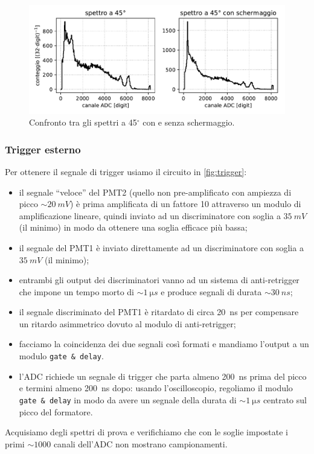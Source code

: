\begin{figure}
	\centering
	\includegraphics[width=\textwidth]{plotcasetta}
	\caption{Confronto tra gli spettri a 45$^{\circ}$ con e senza schermaggio.}
	\label{casetta}
\end{figure}

\subsubsection{Trigger esterno}
Per ottenere il segnale di trigger usiamo il circuito in \autoref{fig:trigger}:
\begin{itemize}
	\item il segnale ``veloce'' del PMT2 (quello non pre-amplificato con ampiezza di picco $\sim\SI{20}{mV}$) è prima amplificata di un fattore 10 attraverso un modulo di amplificazione lineare, quindi inviato ad un discriminatore con soglia a $\SI{35}{mV}$ (il minimo) in modo da ottenere una soglia efficace più bassa;
	\item il segnale del PMT1 è inviato direttamente ad un discriminatore con soglia a $\SI{35}{mV}$ (il minimo);
	\item entrambi gli output dei discriminatori vanno ad un sistema di anti-retrigger che impone un tempo morto di $\sim\SI{1}{\micro s}$ e produce segnali di durata $\sim\SI{30}{ns}$;
	\item il segnale discriminato del PMT1 è ritardato di circa \SI{20}{ns} per compensare un ritardo asimmetrico dovuto al modulo di anti-retrigger;
	\item facciamo la coincidenza dei due segnali così formati e mandiamo l'output a un modulo \texttt{gate \& delay}.
	\item l'ADC richiede un segnale di trigger che parta almeno \SI{200}{ns} prima del picco e termini almeno \SI{200}{ns} dopo: usando l'oscilloscopio, regoliamo il modulo \texttt{gate \& delay} in modo da avere un segnale della durata di $\sim\SI{1}{\micro s}$ centrato sul picco del formatore.
\end{itemize}
Acquisiamo degli spettri di prova e verifichiamo che con le soglie impostate i primi $\sim1000$ canali dell'ADC non mostrano campionamenti.

